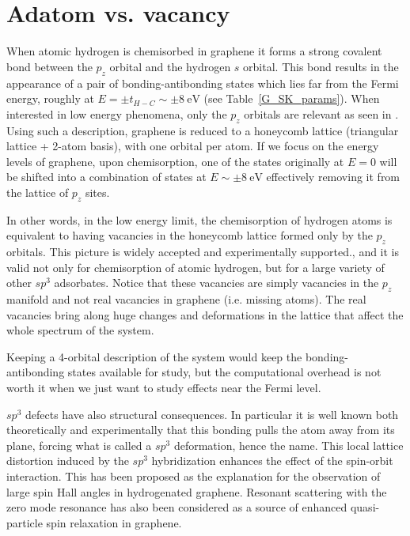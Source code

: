 \section{Adatom vs. vacancy}
When atomic hydrogen is chemisorbed in graphene it forms a strong covalent bond between the $p_z$ orbital and the hydrogen $s$ orbital. This bond results in the appearance of a pair of bonding-antibonding states which lies far from the Fermi energy, roughly at $E=\pm t_{H-C} \sim \pm\SI{8}{\eV}$ (see Table~\ref{G_SK_params}). When interested in low energy phenomena, only the $p_z$ orbitals are relevant as seen in . Using such a description, graphene is reduced to a honeycomb lattice (triangular lattice + 2-atom basis), with one orbital per atom.
If we focus on the energy levels of graphene, upon chemisorption, one of the states originally at $E=0$ will be shifted into a combination of states at $E\sim\pm\SI{8}{\eV}$ effectively removing it from the lattice of $p_z$ sites.

In other words, in the low energy limit, the chemisorption of hydrogen atoms is equivalent to having vacancies in the honeycomb lattice formed only by the $p_z$ orbitals.
This picture is widely accepted and experimentally supported.\cite{Pereira2006, Kumazaki2007, Wehling2007, Pereira2008, Palacios2008}, and it is valid not only for chemisorption of atomic hydrogen, but for a large variety of other $sp^3$ adsorbates. \cite{Santos2012}
Notice that these vacancies are simply vacancies in the $p_z$ manifold and not real vacancies in graphene (i.e. missing atoms). The real vacancies bring along huge changes and deformations in the lattice that affect the whole spectrum of the system.

Keeping a 4-orbital description of the system would keep the bonding-antibonding states available for study, but the computational overhead is not worth it when we just want to study effects near the Fermi level.


$sp^3$ defects have also structural consequences. In particular it is well known both theoretically and experimentally that this bonding pulls the  atom away from its plane, forcing what is called a $sp^3$ deformation, hence the name.
This local lattice distortion induced by the $sp^3$ hybridization enhances the effect of the spin-orbit interaction.\cite{Castro2009a,Gmitra2013} This has been proposed as the explanation for the observation of large spin Hall angles in hydrogenated graphene.\cite{Balakrishnan2013} Resonant scattering with the zero mode resonance has also been considered as a source of enhanced quasi-particle spin relaxation in graphene.\cite{Wojtaszek2013, Kochan2014, soriano2015}





